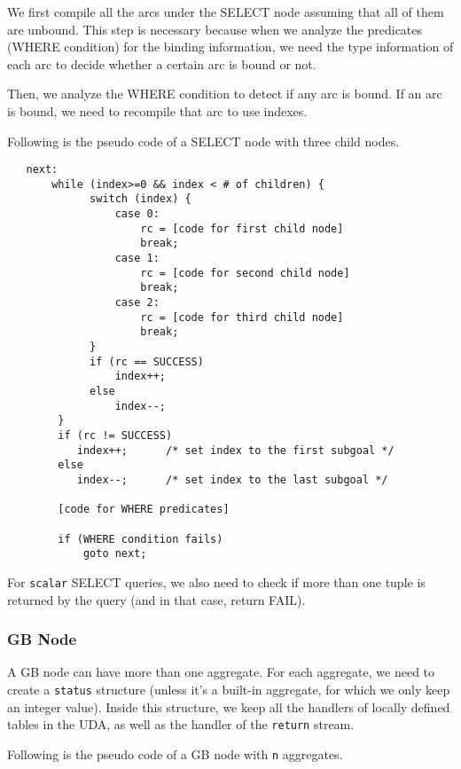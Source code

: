 We first compile all the arcs under the SELECT node assuming that all
of them are unbound. This step is necessary because when we analyze
the predicates (WHERE condition) for the binding information, we need
the type information of each arc to decide whether a certain arc is
bound or not.

Then, we analyze the WHERE condition to detect if any arc is bound.
If an arc is bound, we need to recompile that arc to use indexes.
     
Following is the pseudo code of a SELECT node with three child nodes.
{
\renewcommand{\baselinestretch}{1}
\begin{verbatim}
   next:
       while (index>=0 && index < # of children) {
             switch (index) {
                 case 0:
                     rc = [code for first child node]
                     break;
                 case 1:
                     rc = [code for second child node]
                     break;
                 case 2:
                     rc = [code for third child node]
                     break;
             }
             if (rc == SUCCESS) 
                 index++;
             else 
                 index--;
        } 
        if (rc != SUCCESS)
           index++;      /* set index to the first subgoal */
        else
           index--;      /* set index to the last subgoal */

        [code for WHERE predicates]

        if (WHERE condition fails)
            goto next;
\end{verbatim}
}

For {\tt scalar} SELECT queries, we also need to check if more than
one tuple is returned by the query (and in that case, return FAIL).

\subsubsection*{GB Node}
A GB node can have more than one aggregate. For each aggregate, we
need to create a {\tt status} structure (unless it's a built-in
aggregate, for which we only keep an integer value). Inside this
structure, we keep all the handlers of locally defined tables in the
UDA, as well as the handler of the {\tt return} stream.

Following is the pseudo code of a GB node with {\tt n} aggregates.

